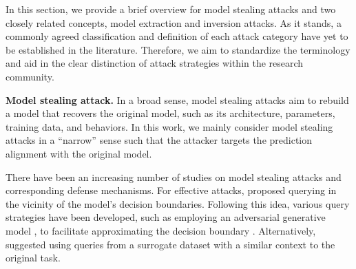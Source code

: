 

    In this section, we provide a brief overview for model stealing attacks and two closely related concepts, model extraction and inversion attacks. As it stands, a commonly agreed classification and definition of each attack category have yet to be established in the literature. Therefore, we aim to standardize the terminology and aid in the clear distinction of attack strategies within the research community.

    \textbf{Model stealing attack.} In a broad sense, model stealing attacks aim to rebuild a model that recovers the original model, such as its architecture, parameters, training data, and behaviors. In this work, we mainly consider model stealing attacks in a ``narrow'' sense such that the attacker targets the prediction alignment with the original model.
    
    There have been an increasing number of studies on model stealing attacks and corresponding defense mechanisms. 
    For effective attacks, \citet{tramer2016stealing} proposed querying in the vicinity of the model's decision boundaries. Following this idea, various query strategies have been developed, such as employing an adversarial generative model \citep{goodfellow2020generative}, to facilitate approximating the decision boundary \citep{papernot2017practical, juuti2019prada, yu2020cloudleak, kariyappa2021maze, truong2021data, yuan2022attack, sanyal2022towards, wang2022black}. 
    Alternatively, \citet{correia2018copycat, orekondy2019knockoff} suggested using queries from a surrogate dataset with a similar context to the original task. 

